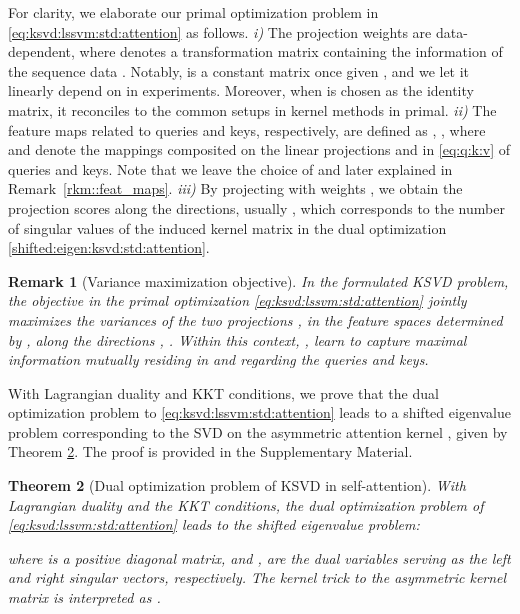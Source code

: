 \documentclass{article}
\newtheorem{theorem}{Theorem}[section]
\newtheorem{remark}[theorem]{Remark}
\begin{document}
	For clarity, we elaborate our primal optimization problem in \eqref{eq:ksvd:lssvm:std:attention} as follows.
	\textit{i)} The projection weights are data-dependent, where 
	{} denotes a transformation matrix containing the information of the sequence data .
	Notably,  is a constant matrix once given , and we let it linearly depend on  in experiments.
	Moreover, when  is chosen as the identity matrix, it reconciles to the common setups in kernel methods in primal.
	\textit{ii)} The feature maps related to queries and keys, respectively, are  defined as , , where  and  denote the mappings composited on the linear projections  and  in \eqref{eq:q:k:v} of queries and keys.
	Note that we leave the choice of  and  later explained in Remark~\ref{rkm::feat_maps}.
	\textit{iii)} By projecting  with  weights , we obtain the projection scores  along the  directions, {usually }, which corresponds to the number of singular values of the induced kernel matrix in the dual optimization \eqref{shifted:eigen:ksvd:std:attention}.
	
	
	
	
	
	
	\begin{remark} [Variance maximization objective]\label{rmk:obj}
		In the formulated KSVD problem, the objective in the primal optimization \eqref{eq:ksvd:lssvm:std:attention} jointly maximizes the variances of the two 
		{projections ,  in the feature spaces determined by ,  along the directions , .}
	Within this context,  ,  
	learn to capture maximal information mutually residing in  and  regarding the queries and keys. 
\end{remark}

With Lagrangian duality and KKT conditions, we prove that the dual optimization problem to \eqref{eq:ksvd:lssvm:std:attention} leads to a shifted eigenvalue problem corresponding to the SVD on the asymmetric attention kernel , given by Theorem \ref{theorem:ksvd:dual}. 
The proof is provided in the Supplementary Material.



\begin{theorem} [Dual optimization problem of KSVD in self-attention]\label{theorem:ksvd:dual}
	With Lagrangian duality and the KKT conditions, the dual optimization problem of \eqref{eq:ksvd:lssvm:std:attention} leads to the shifted eigenvalue problem:
	
	where  is a positive diagonal matrix, and  , 
	 are the dual variables serving as the left and right singular vectors, respectively.  
	{The kernel trick to the asymmetric kernel matrix  is interpreted as .}
\end{theorem}
\end{document}

